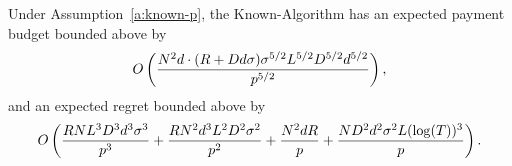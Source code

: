 \begin{theorem}
\label{rst:known-p}
Under Assumption~\ref{a:known-p}, the Known-\MinProb Algorithm has an expected payment budget bounded above by 
\begin{align*}
O \left(\frac{N^2 d \cdot (R + D d \sigma)\sigma^{5/2}L^{5/2}D^{5/2}d^{5/2}}{p^{5/2}} \right),
\end{align*}
and an expected regret bounded above by
\begin{align*}
O \left(\frac{R N L^3 D^3 d^3 \sigma^3}{p^3}
  + \frac{R N^2 d^3 L^2 D^2 \sigma^2}{p^2}
  + \frac{N^2 dR}{p}
  + \frac{ND^2 d^2\sigma^2 L(\log(T))^3}{p}\right).
\end{align*}
\end{theorem}

